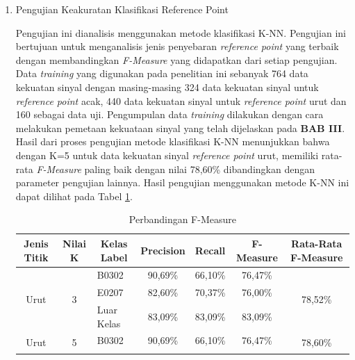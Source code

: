 \begin{enumerate}

	\item Pengujian Keakuratan Klasifikasi Reference Point

	      \par Pengujian ini dianalisis menggunakan metode klasifikasi K-NN. Pengujian ini bertujuan untuk menganalisis jenis penyebaran \textit{reference point} yang terbaik dengan membandingkan \textit{F-Measure} yang didapatkan dari setiap pengujian. Data \textit{training} yang digunakan pada penelitian ini sebanyak 764 data kekuatan sinyal dengan masing-masing 324 data kekuatan sinyal untuk \textit{reference point} acak, 440 data kekuatan sinyal untuk \textit{reference point} urut dan 160 sebagai data uji. Pengumpulan data \textit{training} dilakukan dengan cara melakukan pemetaan kekuataan sinyal yang telah dijelaskan pada \textbf{BAB III}. Hasil dari proses pengujian metode klasifikasi K-NN menunjukkan bahwa dengan K=5 untuk data kekuatan sinyal \textit{reference point} urut, memiliki rata-rata \textit{F-Measure} paling baik dengan nilai 78,60\% dibandingkan dengan parameter pengujian lainnya. Hasil pengujian menggunakan metode K-NN ini  dapat dilihat pada Tabel \ref{tabelfmeasure9}.
	      \begin{table}[H]
		      \fontsize{9}{12}\selectfont
		      \center
		      \caption{Perbandingan F-Measure}
		      \label{tabelfmeasure9}
		      \begin{tabular}{|c|c|l|c|c|c|c|}
			      \hline
			      Jenis Titik           & Nilai K            & \multicolumn{1}{c|}{Kelas Label} & Precision & Recall  & F-Measure & Rata-Rata F-Measure      \\ \hline
			      \multirow{3}{*}{Urut} & \multirow{3}{*}{3} & B0302                            & 90,69\%   & 66,10\% & 76,47\%   & \multirow{3}{*}{78,52\%} \\ \cline{3-6}
			                            &                    & E0207                            & 82,60\%   & 70,37\% & 76,00\%   &                          \\ \cline{3-6}
			                            &                    & Luar Kelas                       & 83,09\%   & 83,09\% & 83,09\%   &                          \\ \hline
			      \multirow{3}{*}{Urut} & \multirow{3}{*}{5} & B0302                            & 90,69\%   & 66,10\% & 76,47\%   & \multirow{3}{*}{78,60\%} \\ \cline{3-6}

\end{tabular}
\end{table}
\end{enumerate}
